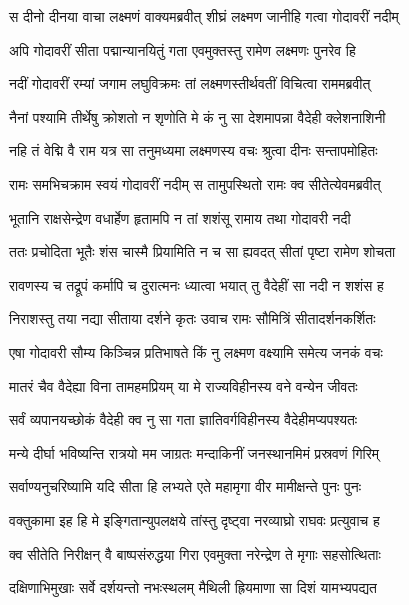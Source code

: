 
\twolineshloka
{स दीनो दीनया वाचा लक्ष्मणं वाक्यमब्रवीत्}
{शीघ्रं लक्ष्मण जानीहि गत्वा गोदावरीं नदीम्} %

\twolineshloka
{अपि गोदावरीं सीता पद्मान्यानयितुं गता}
{एवमुक्तस्तु रामेण लक्ष्मणः पुनरेव हि} %

\twolineshloka
{नदीं गोदावरीं रम्यां जगाम लघुविक्रमः}
{तां लक्ष्मणस्तीर्थवतीं विचित्वा राममब्रवीत्} %

\twolineshloka
{नैनां पश्यामि तीर्थेषु क्रोशतो न शृणोति मे}
{कं नु सा देशमापन्ना वैदेही क्लेशनाशिनी} %

\twolineshloka
{नहि तं वेद्मि वै राम यत्र सा तनुमध्यमा}
{लक्ष्मणस्य वचः श्रुत्वा दीनः सन्तापमोहितः} %

\twolineshloka
{रामः समभिचक्राम स्वयं गोदावरीं नदीम्}
{स तामुपस्थितो रामः क्व सीतेत्येवमब्रवीत्} %

\twolineshloka
{भूतानि राक्षसेन्द्रेण वधार्हेण हृतामपि}
{न तां शशंसू रामाय तथा गोदावरी नदी} %

\twolineshloka
{ततः प्रचोदिता भूतैः शंस चास्मै प्रियामिति}
{न च सा ह्यवदत् सीतां पृष्टा रामेण शोचता} %

\twolineshloka
{रावणस्य च तद्रूपं कर्मापि च दुरात्मनः}
{ध्यात्वा भयात् तु वैदेहीं सा नदी न शशंस ह} %

\twolineshloka
{निराशस्तु तया नद्या सीताया दर्शने कृतः}
{उवाच रामः सौमित्रिं सीतादर्शनकर्शितः} %

\twolineshloka
{एषा गोदावरी सौम्य किञ्चिन्न प्रतिभाषते}
{किं नु लक्ष्मण वक्ष्यामि समेत्य जनकं वचः} %

\twolineshloka
{मातरं चैव वैदेह्या विना तामहमप्रियम्}
{या मे राज्यविहीनस्य वने वन्येन जीवतः} %

\twolineshloka
{सर्वं व्यपानयच्छोकं वैदेही क्व नु सा गता}
{ज्ञातिवर्गविहीनस्य वैदेहीमप्यपश्यतः} %

\twolineshloka
{मन्ये दीर्घा भविष्यन्ति रात्रयो मम जाग्रतः}
{मन्दाकिनीं जनस्थानमिमं प्रस्रवणं गिरिम्} %

\twolineshloka
{सर्वाण्यनुचरिष्यामि यदि सीता हि लभ्यते}
{एते महामृगा वीर मामीक्षन्ते पुनः पुनः} %

\twolineshloka
{वक्तुकामा इह हि मे इङ्गितान्युपलक्षये}
{तांस्तु दृष्ट्वा नरव्याघ्रो राघवः प्रत्युवाच ह} %

\twolineshloka
{क्व सीतेति निरीक्षन् वै बाष्पसंरुद्धया गिरा}
{एवमुक्ता नरेन्द्रेण ते मृगाः सहसोत्थिताः} %

\twolineshloka
{दक्षिणाभिमुखाः सर्वे दर्शयन्तो नभःस्थलम्}
{मैथिली ह्रियमाणा सा दिशं यामभ्यपद्यत} %

